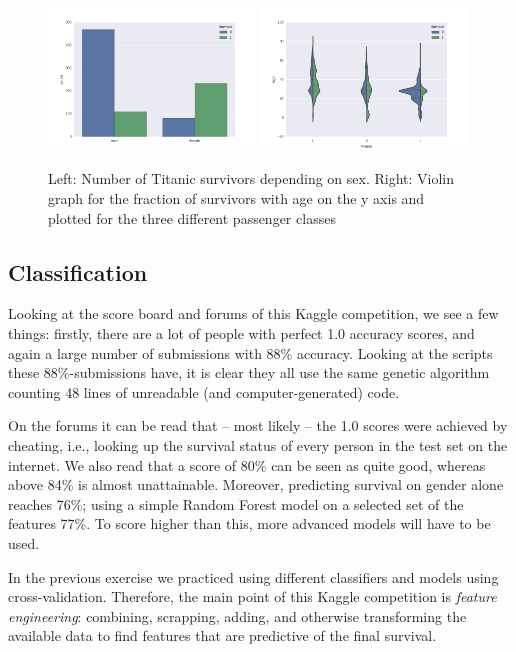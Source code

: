\documentclass[runningheads,a4paper]{llncs}
\begin{document}
\begin{figure}[t]
\centering
  \includegraphics[width=0.49\textwidth]{sexSurv}
  \includegraphics[width=0.49\textwidth]{classSurv}
  \caption{Left: Number of Titanic survivors depending on sex. Right: Violin graph for the fraction of survivors with age on the y axis and plotted for the three different passenger classes}
  \label{fig:titExpl}
\end{figure}

\subsection{Classification}
Looking at the score board and forums of this Kaggle competition, we see a few things: firstly, there are a lot of people with perfect 1.0 accuracy scores, and again a large number of submissions with 88\% accuracy.  Looking at the scripts these 88\%-submissions have, it is clear they all use the same genetic algorithm counting 48 lines of unreadable (and computer-generated) code.

On the forums it can be read that -- most likely -- the 1.0 scores were achieved by cheating, i.e., looking up the survival status of every person in the test set on the internet.  We also read that a score of 80\% can be seen as quite good, whereas above 84\% is almost unattainable.  Moreover, predicting survival on gender alone reaches 76\%; using a simple Random Forest model on a selected set of the features 77\%.  To score higher than this, more advanced models will have to be used.

In the previous exercise we practiced using different classifiers and models using cross-validation.  Therefore, the main point of this Kaggle competition is \emph{feature engineering}: combining, scrapping, adding, and otherwise transforming the available data to find features that are predictive of the final survival.  
\end{document}
